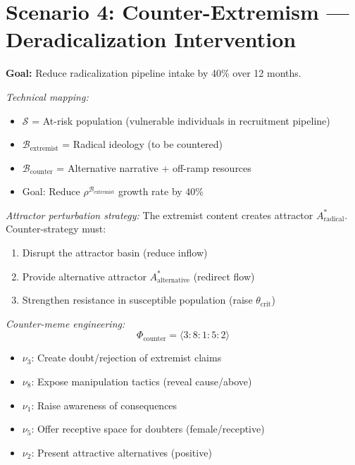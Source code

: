 \documentclass[11pt,twoside]{book}
\theoremstyle{definition}
\theoremstyle{plain}
\theoremstyle{remark}
\newcommand{\noe}[1]{\nu_{#1}}
\newcommand{\Frac}{\Phi}
\begin{document}
\section{Scenario 4: Counter-Extremism --- Deradicalization Intervention}

\begin{tcolorbox}[colback=yellow!5!white,colframe=yellow!65!black,title=\textbf{Scenario: Counter-Extremism Campaign},breakable]

\textbf{Goal:} Reduce radicalization pipeline intake by 40\% over 12 months.

\textit{Technical mapping:}
\begin{itemize}
    \item $\mathcal{S}$ = At-risk population (vulnerable individuals in recruitment pipeline)
    \item $\mathcal{B}_{\mathrm{extremist}}$ = Radical ideology (to be countered)
    \item $\mathcal{B}_{\mathrm{counter}}$ = Alternative narrative + off-ramp resources
    \item Goal: Reduce $\rho^{\mathcal{B}_{\mathrm{extremist}}}$ growth rate by 40\%
\end{itemize}

\textit{Attractor perturbation strategy:}
The extremist content creates attractor $A_{\mathrm{radical}}^*$. Counter-strategy must:
\begin{enumerate}
    \item Disrupt the attractor basin (reduce inflow)
    \item Provide alternative attractor $A_{\mathrm{alternative}}^*$ (redirect flow)
    \item Strengthen resistance in susceptible population (raise $\theta_{\mathrm{crit}}$)
\end{enumerate}

\textit{Counter-meme engineering:}
\[
    \Frac_{\mathrm{counter}} = \langle 3:8:1:5:2 \rangle
\]
\begin{itemize}
    \item $\noe{3}$: Create doubt/rejection of extremist claims
    \item $\noe{8}$: Expose manipulation tactics (reveal cause/above)
    \item $\noe{1}$: Raise awareness of consequences
    \item $\noe{5}$: Offer receptive space for doubters (female/receptive)
    \item $\noe{2}$: Present attractive alternatives (positive)
\end{itemize}


\end{tcolorbox}
\end{document}
